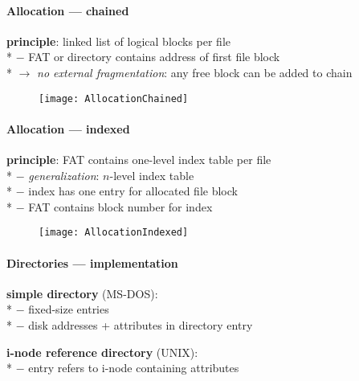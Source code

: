 \paragraph{Allocation --- chained}
\begin{items}
  \item \textbf{principle}: linked list of logical blocks per file \\*
    $ - $ FAT or directory contains address of first file block \\*
    $ \to $ \emph{no external fragmentation}: any free block can be added to chain
\end{items}
\begin{figure}[H]\centering\label{AllocationChained}\texttt{[image: AllocationChained]}\end{figure}

\paragraph{Allocation --- indexed}
\begin{items}
  \item \textbf{principle}: FAT contains one-level index table per file \\*
    $ - $ \emph{generalization}: $ n $-level index table \\*
    $ - $ index has one entry for allocated file block \\*
    $ - $ FAT contains block number for index
\end{items}
\begin{figure}[H]\centering\label{AllocationIndexed}\texttt{[image: AllocationIndexed]}\end{figure}

\paragraph{Directories --- implementation}
\begin{items}
  \item \textbf{simple directory} (MS-DOS): \\*
    $ - $ fixed-size entries \\*
    $ - $ disk addresses + attributes in directory entry
  \item \textbf{i-node reference directory} (UNIX): \\*
    $ - $ entry refers to i-node containing attributes
\end{items}

